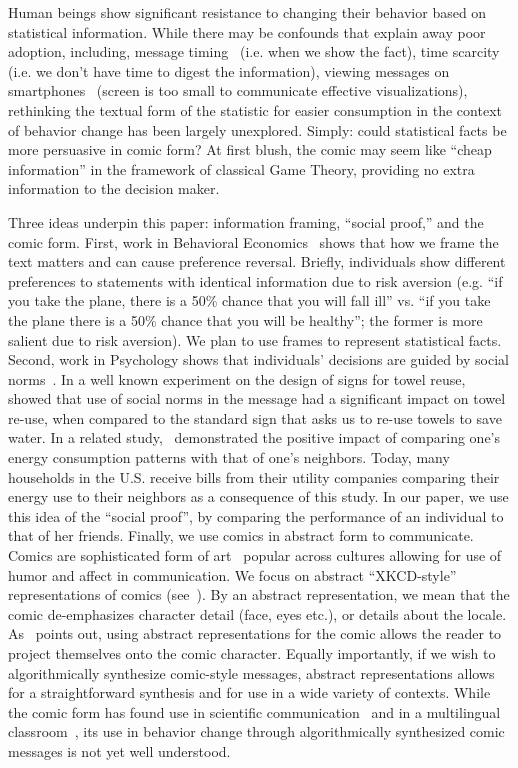 Human beings show significant resistance to changing their behavior based on statistical information. While there may be confounds that explain away poor adoption, including, message timing~\cite{Fogg2009} (i.e. when we show the fact), time scarcity~\cite{Janssen2016} (i.e. we don't have time to digest the information), viewing messages on smartphones~\cite{Kim2016} (screen is too small to communicate effective visualizations), rethinking the textual form of the statistic for easier consumption in the context of behavior change has been largely unexplored. Simply: could statistical facts be more persuasive in comic form? At first blush, the comic may seem like ``cheap information'' in the framework of classical Game Theory, providing no extra information to the decision maker.

Three ideas underpin this paper: information framing, ``social proof,'' and the comic form. First, work in Behavioral Economics~\cite{tversky1992advances,tversky1981framing} shows that how we frame the text matters and can cause preference reversal. Briefly, individuals show different preferences to statements with identical information due to risk aversion (e.g. ``if you take the plane, there is a 50\% chance that you will fall ill'' vs. ``if you take the plane there is a 50\% chance that you will be healthy''; the former is more salient due to risk aversion). We plan to use frames to represent statistical facts. Second, work in Psychology shows that individuals' decisions are guided by social norms~\cite{goldstein2008room,schultz2007constructive}. In a well known experiment on the design of signs for towel reuse,~\textcite{goldstein2008room} showed that use of social norms in the message had a significant impact on towel re-use, when compared to the standard sign that asks us to re-use towels to save water. In a related study,~\textcite{schultz2007constructive} demonstrated the positive impact of comparing one's energy consumption patterns with that of one's neighbors. Today, many households in the U.S. receive bills from their utility companies comparing their energy use to their neighbors as a consequence of this study. In our paper, we use this idea of the ``social proof'', by comparing the performance of an individual to that of her friends. Finally, we use comics in abstract form to communicate. Comics are sophisticated form of art~\cite{scott1993understanding} popular across cultures allowing for use of humor and affect in communication. We focus on abstract ``XKCD-style'' ~\cite{munroe2009xkcd}  representations of comics (see~). By an abstract representation, we mean that the comic de-emphasizes character detail (face, eyes etc.), or details about the locale. As~\textcite{scott1993understanding} points out, using abstract representations for the comic allows the reader to project themselves onto the comic character. Equally importantly, if we wish to algorithmically synthesize comic-style messages, abstract representations allows for a straightforward synthesis and for use in a wide variety of contexts. While the comic form has found use in scientific communication~\cite{McDermottPB18} and in a multilingual classroom~\cite{cary2004going}, its use in behavior change through algorithmically synthesized comic messages is not yet well understood.


